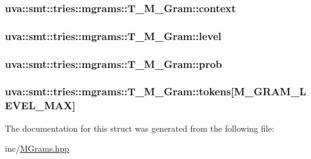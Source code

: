 \subsubsection[{context}]{ uva\+::smt\+::tries\+::mgrams\+::\+T\+\_\+\+M\+\_\+\+Gram\+::context}\label{structuva_1_1smt_1_1tries_1_1mgrams_1_1_t___m___gram_a046366a2327c031419e7635690b3be6a}
\hypertarget{structuva_1_1smt_1_1tries_1_1mgrams_1_1_t___m___gram_a24d61970baa93c4d85009638b647232d}{}
\subsubsection[{level}]{ uva\+::smt\+::tries\+::mgrams\+::\+T\+\_\+\+M\+\_\+\+Gram\+::level}\label{structuva_1_1smt_1_1tries_1_1mgrams_1_1_t___m___gram_a24d61970baa93c4d85009638b647232d}
\hypertarget{structuva_1_1smt_1_1tries_1_1mgrams_1_1_t___m___gram_a20a966687227ab416795bf9de58102a6}{}
\subsubsection[{prob}]{ uva\+::smt\+::tries\+::mgrams\+::\+T\+\_\+\+M\+\_\+\+Gram\+::prob}\label{structuva_1_1smt_1_1tries_1_1mgrams_1_1_t___m___gram_a20a966687227ab416795bf9de58102a6}
\hypertarget{structuva_1_1smt_1_1tries_1_1mgrams_1_1_t___m___gram_a380e01da0fc81d105c40614e0585e0cd}{}
\subsubsection[{tokens}]{ uva\+::smt\+::tries\+::mgrams\+::\+T\+\_\+\+M\+\_\+\+Gram\+::tokens\mbox{[}M\+\_\+\+G\+R\+A\+M\+\_\+\+L\+E\+V\+E\+L\+\_\+\+M\+A\+X\mbox{]}}\label{structuva_1_1smt_1_1tries_1_1mgrams_1_1_t___m___gram_a380e01da0fc81d105c40614e0585e0cd}


The documentation for this struct was generated from the following file\+:\begin{DoxyCompactItemize}
\item 
inc/\hyperlink{_m_grams_8hpp}{M\+Grams.\+hpp}\end{DoxyCompactItemize}
